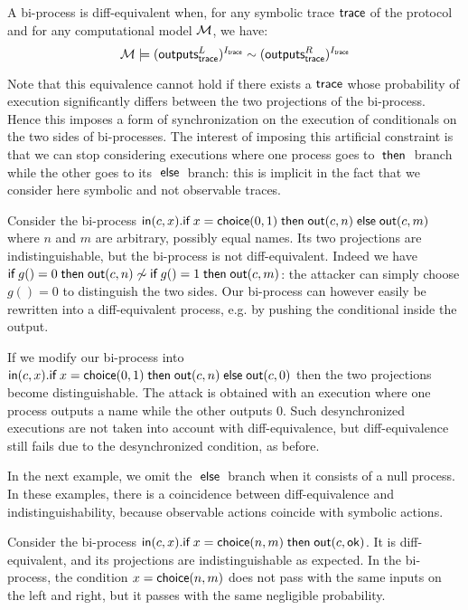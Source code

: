 \begin{definition}
  A bi-process is diff-equivalent when,
  for any symbolic trace $\textsf{trace}$ of the protocol and
  for any computational model $\mathcal{M}$,
  we have:
  \[\mathcal{M} \models (\textsf{outputs}_{\textsf{trace}}^L)^{I_{\textsf{trace}}}  \sim (\textsf{outputs}_{\textsf{trace}}^R)^{I_{\textsf{trace}}}\]
\end{definition}

Note that this equivalence cannot hold if there exists a $\textsf{trace}$
whose probability of execution significantly differs between the two
projections of the bi-process.
Hence this imposes a form of synchronization on the execution of
conditionals on the two sides of bi-processes.
The interest of imposing this artificial constraint is that we
can stop considering executions where one process goes to $\;\textsf{then}\;$
branch while the other goes to its $\;\textsf{else}\;$ branch: this is implicit
in the fact that we consider here symbolic and not observable traces.

\newcommand{\In}{\mathsf{in}}
\newcommand{\Out}{\mathsf{out}}

\begin{example}
  Consider the bi-process
  $\In(c,x).\myif x=\diff{0}{1} \mythen \Out(c,n) \myelse \Out(c,m)$
  where $n$ and $m$ are arbitrary, possibly equal names.
  Its two projections are indistinguishable, but the
  bi-process is not diff-equivalent.
  Indeed we have
  $\myif g()=0 \mythen \Out(c,n) \not\sim
   \myif g()=1 \mythen \Out(c,m)$: the attacker can simply choose
  $g()=0$ to distinguish the two sides.
  Our bi-process can however easily be
  rewritten into a diff-equivalent process, e.g. by pushing the conditional
  inside the output.

  If we modify our bi-process into
  $\In(c,x).\myif x=\diff{0}{1} \mythen \Out(c,n) \myelse \Out(c,0)$
  then the two projections become distinguishable.
  The attack is obtained with an execution
  where one process outputs a name while the other outputs $0$. Such
  desynchronized executions are not taken into account with diff-equivalence,
  but diff-equivalence still fails due to the desynchronized condition,
  as before.
\end{example}

\newcommand{\ok}{\mathsf{ok}}

In the next example, we omit the $\;\textsf{else}\;$ branch when it consists of a null
process. In these examples, there is a coincidence between diff-equivalence
and indistinguishability, because observable actions coincide with symbolic
actions.

\begin{example} \label{ex:negl}
  Consider the bi-process
  $\In(c,x).\myif x=\diff{n}{m} \mythen \Out(c,\ok)$.
  It is diff-equivalent, and its projections are
  indistinguishable as expected.
  In the bi-process, the condition $x=\mathsf{choice}(n,m)$ does not pass
  with the same inputs on the left and right, but it passes with
  the same negligible probability.
\end{example}

